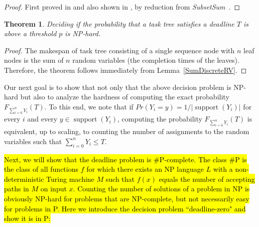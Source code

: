 \documentclass{article}
\newtheorem{theorem}{Theorem}
\DeclareMathOperator{\support}{support}
\begin{document}
\begin{proof} 
First proved in \cite{---} and also shown in \cite{cohen2015estimating}, by reduction from \textit{SubsetSum}~\cite[problem number SP13]{Garey:1990:CIG:574848}.
%
\end{proof}
 
\begin{theorem}
Deciding if the probability that a task tree satisfies a deadline $T$ is above a threshold $p$ is NP-hard.
\end{theorem}

\begin{proof} The makespan of task tree consisting of a single sequence node with $n$ leaf nodes is the sum of $n$ random variables (the completion times of the leaves). Therefore, the theorem follows immediately from Lemma~\ref{SumDiscreteRV}. 
\end{proof}

Our next goal is to show that not only that the above decision problem is NP-hard but also to analyze the hardness of computing the exact probability $F_{\sum_{i=0}^{n} Y_{i}}(T)$. To this end, we note that 
if $Pr(Y_i=y)=1/|\support(Y_i)|$ for every $i$ and every $y\in\support(Y_i)$, computing the probability $F_{\sum_{i=0}^{n} Y_{i}}(T)$ is equivalent, up to scaling, to counting the number of assignments to the random variables  such that $\sum_{i=0}^{n} Y_{i} \leq T$. 



\hl{Next, we will show that the deadline problem is \#P-complete. The class \#P is the class of all functions $f$ for which there exists an NP language $L$ with a non-deterministic Turing machine $M$ such that $f(x)$ equals the
number of accepting paths in $M$ on input $x$. Counting the number of solutions of a problem in
NP is obviously NP-hard for problems that are NP-complete, but not necessarily easy for
problems in P. Here we introduce the decision problem ``deadline-zero" and show it is in P:}
\end{document}
